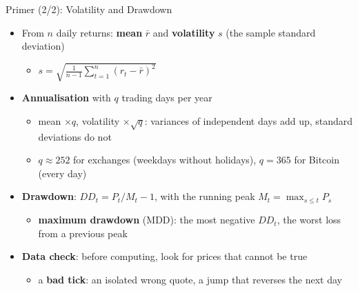 \begin{frame}{Primer (2/2): Volatility and Drawdown}
\itemsize{\small}
\begin{itemize}
    \item From $n$ daily returns: \textbf{mean} $\bar r$ and \textbf{volatility} $s$ (the sample standard deviation)
    \begin{itemize}
        \item $s = \sqrt{\frac{1}{n-1} \sum_{t=1}^n (r_t - \bar r)^2}$
    \end{itemize}
    \item \textbf{Annualisation} with $q$ trading days per year
    \begin{itemize}
        \item mean $\times q$, volatility $\times \sqrt{q}$: variances of independent days add up, standard deviations do not
        \item $q \approx 252$ for exchanges (weekdays without holidays), $q = 365$ for Bitcoin (every day)
    \end{itemize}
    \item \textbf{Drawdown}: $DD_t = P_t / M_t - 1$, with the running peak $M_t = \max_{s \le t} P_s$
    \begin{itemize}
        \item \textbf{maximum drawdown} (MDD): the most negative $DD_t$, the worst loss from a previous peak
    \end{itemize}
    \item \textbf{Data check}: before computing, look for prices that cannot be true
    \begin{itemize}
        \item a \textbf{bad tick}: an isolated wrong quote, a jump that reverses the next day
    \end{itemize}
\end{itemize}
\end{frame}

